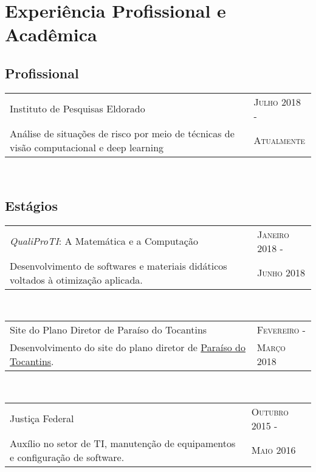 \section{Experiência Profissional e Acadêmica}

\subsection*{Profissional}

\begin{tabular}{p{11cm}|l}
  \label{eldorado}
  Instituto de Pesquisas Eldorado & \textsc{Julho 2018 -} \\
  \footnotesize{Análise de situações de risco por meio de técnicas de visão computacional e deep learning} & \textsc{Atualmente} \\
\end{tabular}\\

\subsection*{Estágios}

\begin{tabular}{p{11cm}|l}
  \textit{QualiProTI}: A Matemática e a Computação & \textsc{Janeiro 2018 -} \\
  \footnotesize{Desenvolvimento de softwares e materiais didáticos voltados à otimização aplicada.} & \textsc{Junho 2018} \\
\end{tabular}\\

\begin{tabular}{p{11cm}|l}
  Site do Plano Diretor de Paraíso do Tocantins & \textsc{Fevereiro -} \\
  \footnotesize{Desenvolvimento do site do plano diretor de \href{https://planodiretorparaiso.com.br/}{Paraíso do Tocantins}.} & \textsc{Março 2018} \\
\end{tabular}\\

\begin{tabular}{p{11cm}|l}
  Justiça Federal & \textsc{Outubro 2015 -} \\
  \footnotesize{Auxílio no setor de TI, manutenção de equipamentos e configuração de software.} & \textsc{Maio 2016}  \\
\end{tabular}\\



